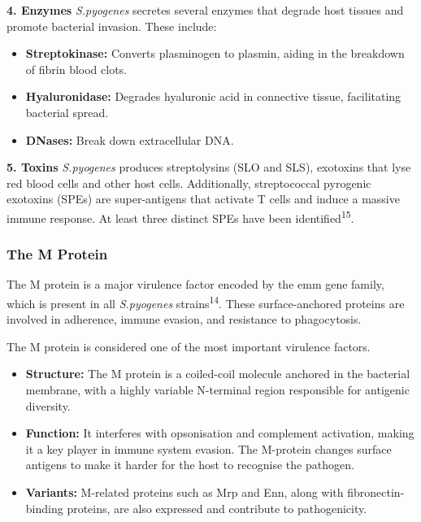 \documentclass[
]{article}
\begin{document}
\textbf{4. Enzymes} \emph{S.pyogenes} secretes several enzymes that
degrade host tissues and promote bacterial invasion. These include:

\begin{itemize}
\item
  \textbf{Streptokinase:} Converts plasminogen to plasmin, aiding in the
  breakdown of fibrin blood clots.
\item
  \textbf{Hyaluronidase:} Degrades hyaluronic acid in connective tissue,
  facilitating bacterial spread.
\item
  \textbf{DNases:} Break down extracellular DNA.
\end{itemize}

\textbf{5. Toxins} \emph{S.pyogenes} produces streptolysins (SLO and
SLS), exotoxins that lyse red blood cells and other host cells.
Additionally, streptococcal pyrogenic exotoxins (SPEs) are
super-antigens that activate T cells and induce a massive immune
response. At least three distinct SPEs have been
identified\textsuperscript{15}.

\subsubsection{The M Protein}\label{the-m-protein}

The M protein is a major virulence factor encoded by the emm gene
family, which is present in all \emph{S.pyogenes}
strains\textsuperscript{14}. These surface-anchored proteins are
involved in adherence, immune evasion, and resistance to phagocytosis.

The M protein is considered one of the most important virulence factors.

\begin{itemize}
\item
  \textbf{Structure:} The M protein is a coiled-coil molecule anchored
  in the bacterial membrane, with a highly variable N-terminal region
  responsible for antigenic diversity.
\item
  \textbf{Function:} It interferes with opsonisation and complement
  activation, making it a key player in immune system evasion. The
  M-protein changes surface antigens to make it harder for the host to
  recognise the pathogen.
\item
  \textbf{Variants:} M-related proteins such as Mrp and Enn, along with
  fibronectin-binding proteins, are also expressed and contribute to
  pathogenicity.
\end{itemize}
\end{document}
